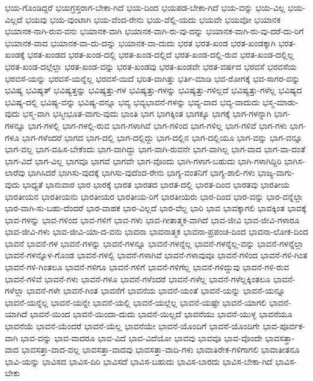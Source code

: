 {ಭಯ-ಗೊಂಡಿದ್ದರೆ
ಭಯಗ್ರಸ್ತರಾಗ-ಬೇಕಾ-ಗಿದೆ
ಭಯ-ದಿಂದ
ಭಯಪಡ-ಬೇಕಾ-ಗಿದೆ
ಭಯ-ವನ್ನು
ಭಯ-ವಿಲ್ಲ
ಭಯ-ವಿಲ್ಲದೆ
ಭಯವು
ಭಯ-ವುಂಟಾಗಿ
ಭಯ-ವೆಂದ-ರೇನು
ಭಯ-ವೆಲ್ಲಿ-ಯದು
ಭಯವೇ
ಭಯವೋ
ಭಯಾನಕ
ಭಯಾನಕ-ನಾಗಿ-ರುವ-ವನು
ಭಯಾನಕ-ವಾಗಿ
ಭಯಾನಕ-ವಾಗಿ-ರು-ವು-ದನ್ನು
ಭಯಾನಕ-ವಾಗಿ-ರು-ವು-ದರೆ-ದು-ರಿಗೆ
ಭಯಾನಕ-ವಾದ
ಭಯಾನಕ-ವಾ-ದು-ದನ್ನು
ಭಯಾನಕ-ವಾ-ದುದು
ಭರತ
ಭರತ-ಖಂಡ
ಭರತ-ಖಂಡಕ್ಕಾಗಿ
ಭರತ-ಖಂಡಕ್ಕೆ
ಭರತ-ಖಂಡದ
ಭರತ-ಖಂಡ-ದಲ್ಲಿ
ಭರತ-ಖಂಡ-ದಲ್ಲಿದೆ
ಭರತ-ಖಂಡ-ದಲ್ಲಿ-ರುವ
ಭರತ-ಖಂಡ-ದಲ್ಲಿಲ್ಲ
ಭರತ-ಖಂಡ-ದಲ್ಲೆಲ್ಲಾ
ಭರತ-ಖಂಡ-ವನ್ನು
ಭರತ-ಖಂಡವು
ಭರತ-ಖಂಡವೇ
ಭರತ-ವರ್ಷದ
ಭರವಸೆ
ಭರವಸೆಯ
ಭರವಸೆ-ಯನ್ನು
ಭರವಸೆ-ಯನ್ನೆಲ್ಲ
ಭರವಸೆ-ಯಿದೆ
ಭರಿತ-ವಾಗಿತ್ತು
ಭರ್ತಿ-ಮಾಡಿ
ಭವ-ರೋಗಕ್ಕೆ
ಭವ-ಸಾಗರ-ವನ್ನು
ಭವಿಷ್ಯ
ಭವಿಷ್ಯತ್
ಭವಿಷ್ಯತ್ತನ್ನು
ಭವಿಷ್ಯತ್ತು-ಗಳ
ಭವಿಷ್ಯತ್ತು-ಗಳನ್ನು
ಭವಿಷ್ಯತ್ತು-ಗಳಿಲ್ಲದೆ
ಭವಿಷ್ಯತ್ತು-ಗಳೆಲ್ಲ
ಭವಿಷ್ಯದ
ಭವಿಷ್ಯ-ದಲ್ಲಿ
ಭವಿಷ್ಯ-ವನ್ನು
ಭವಿಷ್ಯ-ವನ್ನೂ
ಭವ್ಯ
ಭವ್ಯಭಾವನೆ-ಗಳನ್ನು
ಭವ್ಯ-ವಾದ
ಭವ್ಯ-ವಾದುದು
ಭಸ್ಮ-ಮಾಡು-ವುದು
ಭಸ್ಮ-ವಾಗಿ
ಭಸ್ಮೀಭೂತ-ವಾಗು-ವುದು
ಭಾಂತಿ
ಭಾಗ
ಭಾಗಕ್ಕಿಂತ
ಭಾಗಕ್ಕೂ
ಭಾಗಕ್ಕೆ
ಭಾಗ-ಗಳನ್ನಾಗಿ
ಭಾಗ-ಗಳನ್ನೂ
ಭಾಗ-ಗಳಲ್ಲಿ
ಭಾಗ-ಗಳಲ್ಲಿ-ರುವ
ಭಾಗ-ಗಳಾಗಿವೆ
ಭಾಗ-ಗಳಿಂದ
ಭಾಗ-ಗಳಿಲ್ಲ
ಭಾಗ-ಗಳಿವೆ
ಭಾಗ-ಗಳು
ಭಾಗ-ಗಳೂ
ಭಾಗ-ಗಳೆಂದರೆ
ಭಾಗದ
ಭಾಗ-ದಲ್ಲಿ
ಭಾಗ-ದಲ್ಲಿದ್ದು
ಭಾಗ-ದಲ್ಲಿನ
ಭಾಗ-ದಲ್ಲಿಯೂ
ಭಾಗ-ವನ್ನು
ಭಾಗ-ವನ್ನೂ
ಭಾಗ-ವಲ್ಲ
ಭಾಗ-ವಹಿಸ-ಬೇಕೆಂದು
ಭಾಗ-ವಾಗಿದ್ದು
ಭಾಗ-ವಾಗಿ-ರುವನೇ
ಭಾಗ-ವಾಗಿಲ್ಲ
ಭಾಗ-ವಾದ
ಭಾಗ-ವಾ-ದಂತೆ
ಭಾಗ-ವಿದೆ
ಭಾಗ-ವಿಲ್ಲ
ಭಾಗವೂ
ಭಾಗವೆ
ಭಾಗವೇ
ಭಾಗ-ವೊಂದು
ಭಾಗಿ-ಗಳಾಗ-ಬಹುದು
ಭಾಗಿ-ಗಳಾಗಿದ್ದಿರಿ
ಭಾಗಿಸ-ಲಾರೆವು
ಭಾಗಿಸಿದರೆ
ಭಾಗಿಸು-ವುದಕ್ಕೆ
ಭಾಗಿಸು-ವುದೆಂದ-ರೇನು
ಭಾಗ್ಯ-ವಂತನಿಗೆ
ಭಾಗ್ಯ-ಶಾಲಿ-ಗಳು
ಭಾಜ್ಯ-ವಾಗು-ವುದು
ಭಾಧ್ಯತೆ
ಭಾನುವಾರ
ಭಾರ
ಭಾರಕ್ಕೆ
ಭಾರತ
ಭಾರತದ
ಭಾರತ-ದಲ್ಲಿ
ಭಾರತ-ದಿಂದ
ಭಾರತವು
ಭಾರತೀಯ
ಭಾರತೀಯನ
ಭಾರತೀಯನು
ಭಾರತೀಯರ
ಭಾರತೀಯ-ರಿಗೆ
ಭಾರತೀಯರು
ಭಾರ-ದಿಂದ
ಭಾರ-ವನ್ನು
ಭಾರ-ವನ್ನೆಲ್ಲಾ
ಭಾರ-ವಾಗಿ-ಸು-ಬಹು-ದೆಂದರೆ
ಭಾರ-ವಾಹಕ
ಭಾರ-ವಿಲ್ಲದೆ
ಭಾರ-ವೆಲ್ಲ
ಭಾರಿ
ಭಾವ
ಭಾವಕ್ಕಾಗಲಿ
ಭಾವಕ್ಕಿಂತ
ಭಾವಕ್ಕೆ
ಭಾವ-ಗಳನ್ನು
ಭಾವ-ಗಳಿಂದ
ಭಾವ-ಗಳಿಗೆ
ಭಾವ-ಗಳು
ಭಾವ-ಗೀತಾತ್ಮಕ-ವಾಗಿದೆ
ಭಾವ-ಜೀವಿ
ಭಾವ-ಜೀವಿ-ಗಳಾರೂ
ಭಾವ-ಜೀವಿ-ಗಳು
ಭಾವ-ಜೀವಿ-ಯಾ-ದ-ವನು
ಭಾವನಾ
ಭಾವನಾತ್ಮಕ
ಭಾವನಾ-ಪ್ರಪಂಚ-ದಿಂದ
ಭಾವನಾ-ಲೋಕ-ದಿಂದ
ಭಾವನೆ
ಭಾವನೆ-ಗಳ
ಭಾವನೆ-ಗಳನ್ನು
ಭಾವನೆ-ಗಳನ್ನೂ
ಭಾವನೆ-ಗಳನ್ನೆಲ್ಲ
ಭಾವನೆ-ಗಳನ್ನೆಲ್ಲ-ವನ್ನು
ಭಾವನೆ-ಗಳನ್ನೆಲ್ಲಾ
ಭಾವನೆ-ಗಳನ್ನೊಳ-ಗೊಂಡ
ಭಾವನೆ-ಗಳಲ್ಲಿ
ಭಾವನೆ-ಗಳಾಗಿವೆ
ಭಾವನೆ-ಗಳಾವುವೂ
ಭಾವನೆ-ಗಳಿಂದ
ಭಾವನೆ-ಗಳಿ-ಗಿಂತ
ಭಾವನೆ-ಗಳಿ-ಗಿಂತಲೂ
ಭಾವನೆ-ಗಳಿಗೂ
ಭಾವನೆ-ಗಳಿಗೆ
ಭಾವನೆ-ಗಳಿಗೆಲ್ಲ
ಭಾವನೆ-ಗಳಿದ್ದುವು
ಭಾವನೆ-ಗಳಿ-ರುವ
ಭಾವನೆ-ಗಳಿವೆ
ಭಾವನೆ-ಗಳು
ಭಾವನೆ-ಗಳೂ
ಭಾವನೆ-ಗಳೆಂದರೆ
ಭಾವನೆ-ಗಳೆಲ್ಲ
ಭಾವನೆ-ಗಳೆಲ್ಲಕ್ಕಿಂತಲೂ
ಭಾವನೆ-ಗಳೆಲ್ಲಾ
ಭಾವನೆ-ಗಳೇ
ಭಾವನೆ-ಗಿಂತ
ಭಾವನೆಗೆ
ಭಾವನೆಯ
ಭಾವನೆ-ಯಂತೆ
ಭಾವನೆ-ಯನ್ನು
ಭಾವನೆ-ಯನ್ನೂ
ಭಾವನೆ-ಯನ್ನೆಲ್ಲ
ಭಾವನೆ-ಯನ್ನೇ
ಭಾವನೆ-ಯಲ್ಲಿ
ಭಾವನೆ-ಯಲ್ಲೆಲ್ಲ
ಭಾವನೆ-ಯಷ್ಟೇ
ಭಾವನೆ-ಯಾಗಲಿ
ಭಾವನೆ-ಯಾಗಿದೆ
ಭಾವನೆ-ಯಿಂದ
ಭಾವನೆ-ಯಿಂದಾ-ದುದು
ಭಾವನೆ-ಯಿಲ್ಲದೆ
ಭಾವನೆಯು
ಭಾವನೆ-ಯುಳ್ಳ
ಭಾವನೆಯೂ
ಭಾವನೆಯೆ
ಭಾವನೆ-ಯೆಂದರೆ
ಭಾವನೆ-ಯೆಲ್ಲ
ಭಾವನೆಯೇ
ಭಾವನೆ-ಯೊಂದಿಗೆ
ಭಾವನೆ-ಯೊಂದಿಗೇ
ಭಾವ-ಪೂರ್ವಕ-ವಾಗಿ
ಭಾವ-ವನ್ನು
ಭಾವ-ವಾದರೂ
ಭಾವ-ವಿದೆ
ಭಾವ-ವಿದೆಯೋ
ಭಾವವು
ಭಾವವೂ
ಭಾವ-ವೊಂದೇ
ಭಾವಸತ್ತಾ-ವಾದ
ಭಾವಸತ್ತಾ-ವಾದ-ವಲ್ಲ
ಭಾವಸತ್ತಾ-ವಾದವು
ಭಾವಸತ್ತಾ-ವಾದಿ-ಗಳು
ಭಾವಾತಿರೇಕ-ಗಳಿಗಾಗಲಿ
ಭಾವಾತೀತನೂ
ಭಾವಿ-ಯನ್ನು
ಭಾವಿಸದ
ಭಾವಿಸ-ದಿರಿ
ಭಾವಿಸದೆ
ಭಾವಿಸ-ಬಹುದು
ಭಾವಿಸ-ಬಾರದು
ಭಾವಿಸ-ಬೇಕಾ-ಗಿದೆ
ಭಾವಿಸ-ಬೇಕು
}
